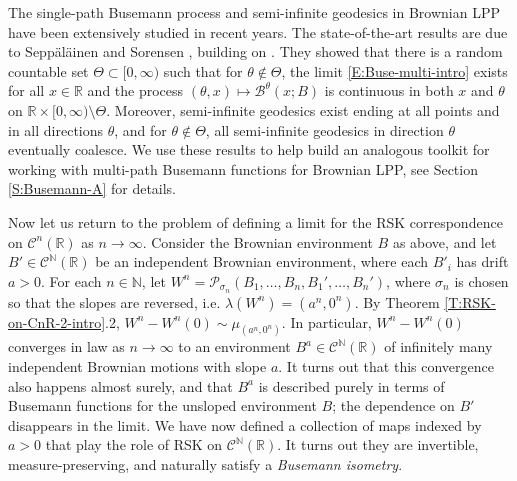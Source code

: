 \documentclass[11pt]{article}
\newcommand{\N}{\mathbb{N}}
\newcommand{\R}{\mathbb{R}}
\newcommand{\sig}{\sigma}
\newcommand{\la}{\lambda}
\newcommand{\cB}{\mathcal{B}}
\newcommand{\cC}{\mathcal{C}}
\newcommand{\cP}{\mathcal{P}}
\newcommand{\X}{\times}
\newcommand{\smin}{\setminus}
\theoremstyle{definition} %
\theoremstyle{remark} %
\begin{document}
 The single-path Busemann process and semi-infinite geodesics in Brownian LPP have been extensively studied in recent years. The state-of-the-art results are due to Sepp\"al\"ainen and Sorensen \cite{seppalainen2023global}, building on \cite{alberts2020busemann, seppalainen2023busemann}. They showed that there is a random countable set $\Theta \subset [0, \infty)$ such that for $\theta \notin \Theta$, the limit \eqref{E:Buse-multi-intro} exists for all $x \in \R$ and the process $(\theta, x) \mapsto \cB^\theta(x ; B)$ is continuous in both $x$ and $\theta$ on $\R \X [0, \infty) \smin \Theta$. Moreover, semi-infinite geodesics exist ending at all points and in all directions $\theta$, and for $\theta \notin \Theta$, all semi-infinite geodesics in direction $\theta$ eventually coalesce. We use these results to help build an analogous toolkit for working with multi-path Busemann functions for Brownian LPP, see Section \ref{S:Busemann-A} for details.
 
 Now let us return to the problem of defining a limit for the RSK correspondence on $\cC^n(\R)$ as $n \to \infty$. Consider the Brownian environment $B$ as above, and let $B' \in \cC^\N(\R)$ be an independent Brownian environment, where each $B'_i$ has drift $a > 0$. For each $n \in \N$, let $W^n = \cP_{\sig_n}(B_1, \dots, B_n, B_1', \dots, B_n')$, where $\sig_n$ is chosen so that the slopes are reversed, i.e. $\la(W^n) = (a^n, 0^n)$. By Theorem \ref{T:RSK-on-CnR-2-intro}.2, $W^n - W^n(0) \sim \mu_{(a^n, 0^n)}$. In particular, $W^n - W^n(0)$ converges in law as $n \to \infty$ to an environment $B^a \in \cC^\N(\R)$ of infinitely many independent Brownian motions with slope $a$. It turns out that this convergence also happens almost surely, and that $B^a$ is described purely in terms of Busemann functions for the unsloped environment $B$; the dependence on $B'$ disappears in the limit. We have now defined a collection of maps indexed by $a > 0$ that play the role of RSK on $\cC^\N(\R)$. It turns out they are invertible, measure-preserving, and naturally satisfy a \textit{Busemann isometry}.
 
\end{document}
